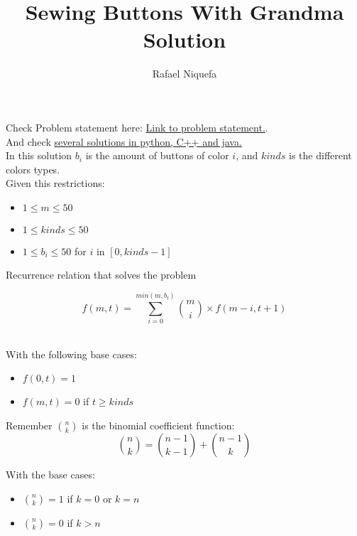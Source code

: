 \documentclass{article}
\title{Sewing Buttons With Grandma Solution}
\author{Rafael Niquefa}
\begin{document}
\maketitle


Check Problem statement here: \href{https://onlinejudge.org/external/123/12316.pdf}{Link to problem statement.}.\\

And check \href{https://github.com/niquefa/dp-and-memoization}{several solutions in python, C++ and java.}\\

In this solution $b_i$ is the amount of buttons of color $i$, and $kinds$ is the different colors types. \\

Given this restrictions: 
\begin{itemize}
  \item $1 \leq m  \leq 50$
  \item $1  \leq kinds \leq 50$
  \item $1 \leq b_i  \leq 50$ for $i$ in $[0,kinds-1]$
\end{itemize}

Recurrence relation that solves the problem

\Huge

\[ f(m,t) = \sum_{i=0}^{min(m,b_t)} {m\choose i}  \times f(m-i,t+1)  \] \\
\normalsize

With the following base cases:  

\begin{itemize}
  \item $f(0,t) = 1$
  \item $f(m,t) = 0$ if $t \geq kinds$
\end{itemize}

Remember ${n\choose k}$ is the binomial coefficient  function:
\Large
\[{n\choose k} = {n-1\choose k-1} + {n-1\choose k}\]
\normalsize

With the base cases:

\begin{itemize}
  \item ${n\choose k} = 1$ if $k=0$ or $k=n$
  \item ${n\choose k} = 0$ if $k>n$
\end{itemize}
\end{document}
